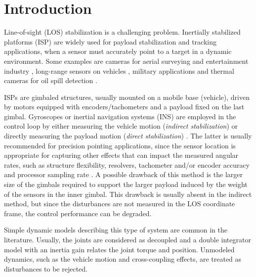 \section{Introduction}
\label{sec:intro}


Line-of-sight (LOS) stabilization is a challenging problem. Inertially stabilized platforms (ISP) are widely used for payload stabilization and tracking applications, when a sensor must accurately point to a target in a dynamic environment.
%
Some examples are cameras for aerial surveying and entertainment industry \cite{Hurak2009}, long-range sensors on vehicles \cite{Debruin2008}, military applications \cite{Kazemy2007} and thermal cameras for oil spill detection \cite{skjelten2011ship}.

ISPs are gimbaled structures, usually mounted on a mobile base (vehicle), driven by motors equipped with encoders/tachometers and a payload fixed on the last gimbal. Gyroscopes or inertial navigation systems (INS) are employed in the control loop by either measuring the vehicle motion (\textit{indirect stabilization}) or directly measuring the payload motion (\textit{direct stabilization}) \cite{Kennedy2003}.
%
The latter is usually recommended for precision pointing applications, since the sensor location is appropriate for capturing other effects that can impact the measured angular rates, such as structure flexibility, resolvers, tachometer and/or encoder accuracy and processor sampling rate \cite{Kennedy2003}. 
%
A possible drawback of this method is the larger size of the gimbals required to support the larger payload induced by the weight of the sensors in the inner gimbal.
%
This drawback is usually absent in the indirect method, but since the disturbances are not measured in the LOS coordinate frame, the control performance can be degraded.

Simple dynamic models describing this type of system are common in the literature. Usually, the joints are considered as decoupled and a double integrator model with an inertia gain relates the joint 
torque and position.
%
Unmodeled dynamics, such as the vehicle motion and cross-coupling effects, are treated as disturbances to be rejected.

